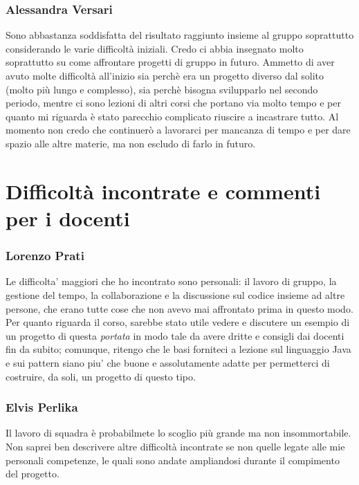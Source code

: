\documentclass[a4paper,12pt]{report}
\begin{document}
\subsubsection{Alessandra Versari}
Sono abbastanza soddisfatta del risultato raggiunto insieme al gruppo soprattutto considerando le varie difficoltà iniziali. Credo ci abbia insegnato molto soprattutto su come affrontare progetti di gruppo in futuro. Ammetto di aver avuto molte difficoltà all'inizio sia perchè era un progetto diverso dal solito (molto più lungo e complesso), sia perchè bisogna svilupparlo nel secondo periodo, mentre ci sono lezioni di altri corsi che portano via molto tempo e per quanto mi riguarda è stato parecchio complicato riuscire a incastrare tutto. Al momento non credo che continuerò a lavorarci per mancanza di tempo e per dare spazio alle altre materie, ma non escludo di farlo in futuro. 

\section{Difficoltà incontrate e commenti per i docenti}

\subsubsection{Lorenzo Prati}
Le difficolta' maggiori che ho incontrato sono personali: il lavoro di gruppo, la gestione del tempo, la collaborazione e la discussione sul codice insieme ad altre persone, che erano tutte cose che non avevo mai affrontato prima in questo modo. Per quanto riguarda il corso, sarebbe stato utile vedere e discutere un esempio di un progetto di questa \textit{portata} in modo tale da avere dritte e consigli dai docenti fin da subito; comunque, ritengo che le basi forniteci a lezione sul linguaggio Java e sui pattern siano piu' che buone e assolutamente adatte per permetterci di costruire, da soli, un progetto di questo tipo.

\subsubsection{Elvis Perlika}
Il lavoro di squadra è probabilmete lo scoglio più grande ma non insommortabile.
Non saprei ben descrivere altre difficoltà incontrate se non quelle legate 
alle mie personali competenze, le quali sono andate ampliandosi durante il compimento del progetto.
\end{document}
